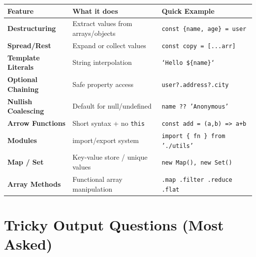 \documentclass[12pt,a4paper]{article}
\begin{document}
\begin{center}
\begin{tabularx}{\textwidth}{|>{\bfseries\color{FaranYellow}}l|X|X|}
\hline
\rowcolor{FaranDark}
\color{white}\textbf{Feature} & \color{white}\textbf{What it does} & \color{white}\textbf{Quick Example} \\
\hline
Destructuring & Extract values from arrays/objects & \texttt{const \{name, age\} = user} \\
\hline
\rowcolor{SectionBg}
Spread/Rest & Expand or collect values & \texttt{const copy = [...arr]} \\
\hline
Template Literals & String interpolation & \texttt{`Hello \$\{name\}`} \\
\hline
\rowcolor{SectionBg}
Optional Chaining & Safe property access & \texttt{user?.address?.city} \\
\hline
Nullish Coalescing & Default for null/undefined & \texttt{name ?? 'Anonymous'} \\
\hline
\rowcolor{SectionBg}
Arrow Functions & Short syntax + no \texttt{this} & \texttt{const add = (a,b) => a+b} \\
\hline
Modules & import/export system & \texttt{import \{ fn \} from './utils'} \\
\hline
\rowcolor{SectionBg}
Map / Set & Key-value store / unique values & \texttt{new Map(), new Set()} \\
\hline
Array Methods & Functional array manipulation & \texttt{.map .filter .reduce .flat} \\
\hline
\end{tabularx}
\end{center}

\section{Tricky Output Questions (Most Asked)}
\end{document}
